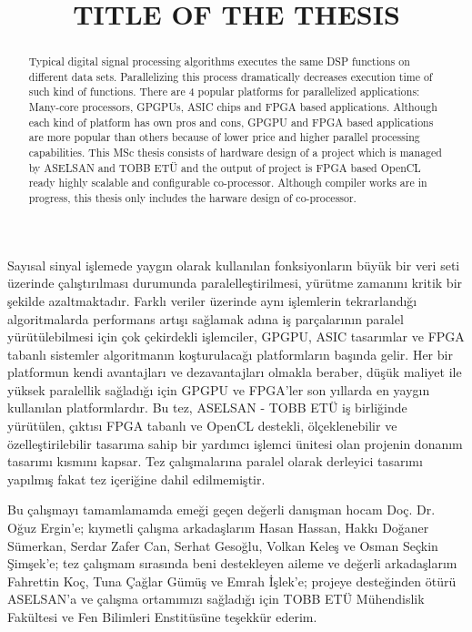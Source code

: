 \documentclass{etutez}
\title{TITLE OF THE THESIS}
\institute{Institute of Natural and Applied Sciences}
\begin{document}
\titlepageMS   %
\signaturepageMS  %
\tezbildirimsayfasi    %


\begin{ozet}
	Sayısal sinyal işlemede yaygın olarak kullanılan fonksiyonların büyük bir veri seti üzerinde çalıştırılması durumunda paralelleştirilmesi, yürütme zamanını kritik bir şekilde azaltmaktadır. Farklı veriler üzerinde aynı işlemlerin tekrarlandığı algoritmalarda performans artışı sağlamak adına iş parçalarının paralel yürütülebilmesi için çok çekirdekli işlemciler, GPGPU, ASIC tasarımlar ve FPGA tabanlı sistemler algoritmanın koşturulacağı platformların başında gelir. Her bir platformun kendi avantajları ve dezavantajları olmakla beraber, düşük maliyet ile yüksek paralellik sağladığı için GPGPU ve FPGA'ler son yıllarda en yaygın kullanılan platformlardır. Bu tez, ASELSAN - TOBB ETÜ iş birliğinde yürütülen, çıktısı FPGA tabanlı ve OpenCL destekli, ölçeklenebilir ve özelleştirilebilir tasarıma sahip bir yardımcı işlemci ünitesi olan projenin donanım tasarımı kısmını kapsar. Tez çalışmalarına paralel olarak derleyici tasarımı yapılmış fakat tez içeriğine dahil edilmemiştir.
\end{ozet}



\begin{abstract}
	Typical digital signal processing algorithms executes the same DSP functions on different data sets. Parallelizing this process dramatically decreases execution time of such kind of functions. There are 4 popular platforms for parallelized applications: Many-core processors, GPGPUs, ASIC chips and FPGA based applications. Although each kind of platform has own pros and cons, GPGPU and FPGA based applications are more popular than others because of lower price and higher parallel processing capabilities. This MSc thesis consists of hardware design of a project which is managed by ASELSAN and TOBB ETÜ and the output of project is FPGA based OpenCL ready highly scalable and configurable co-processor. Although compiler works are in progress, this thesis only includes the harware design of co-processor.  
\end{abstract}


\begin{tesekkur}
 Bu çalışmayı tamamlamamda emeği geçen değerli danışman hocam Doç. Dr. Oğuz Ergin'e; kıymetli çalışma arkadaşlarım Hasan Hassan, Hakkı Doğaner Sümerkan, Serdar Zafer Can, Serhat Gesoğlu, Volkan Keleş ve Osman Seçkin Şimşek'e; tez çalışmam sırasında beni destekleyen aileme ve değerli arkadaşlarım Fahrettin Koç, Tuna Çağlar Gümüş ve Emrah İşlek'e; projeye desteğinden ötürü ASELSAN'a ve çalışma ortamımızı sağladığı için TOBB ETÜ Mühendislik Fakültesi ve Fen Bilimleri Enstitüsüne teşekkür ederim.
\end{tesekkur}



\pagestyle{plain}




\makeatother
\end{document}
